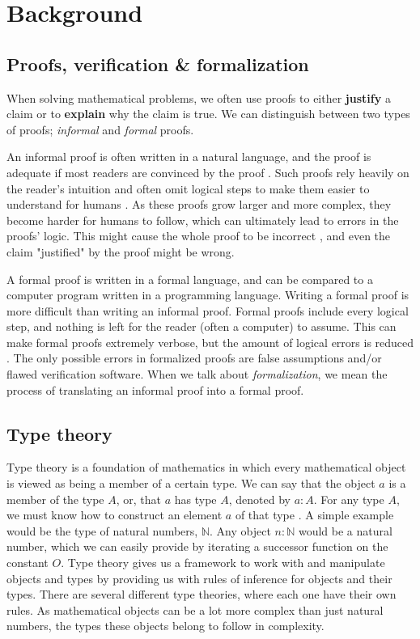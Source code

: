 \chapter{Background}
\label{ch:background}

\section{Proofs, verification \& formalization}
\label{sec:proofs_formalization}

When solving mathematical problems, we often use proofs
to either \textbf{justify} a claim or to \textbf{explain} why the claim is true.
We can distinguish between two types of proofs; \emph{informal} and \emph{formal} proofs.

An informal proof is often written in a natural language, and the proof is adequate if most
readers are convinced by the proof \cite[ch.~2]{bpierce}. Such proofs rely heavily on the reader's intuition
and often omit logical steps to make them easier to understand for humans \cite[p.~1371]{ams:formal-proof}.
As these proofs grow larger and more complex, they become harder for humans to follow,
which can ultimately lead to errors in the proofs' logic. This might cause the whole proof
to be incorrect \cite{rkhamsi}, and even the claim "justified" by the proof might be wrong.

A formal proof is written in a formal language, and can be compared to a computer program
written in a programming language. Writing a formal proof is more difficult than writing an informal proof.
Formal proofs include every logical step, and nothing is left for the reader (often a computer) to assume.
This can make formal proofs extremely verbose, but the amount of logical errors is reduced \cite[p.~1371]{ams:formal-proof}.
The only possible errors in formalized proofs are false assumptions and/or flawed verification software.
When we talk about \emph{formalization}, we mean the process of translating an informal proof into a formal proof.

\section{Type theory}
\label{sec:type_theory}

Type theory is a foundation of mathematics \cite{typetheorystan}
in which every mathematical object is viewed as being a member of a certain type.
We can say that the object $a$ is a member of the type $A$,
or, that $a$ has type $A$, denoted by $a : A$.
For any type $A$, we must know how to construct an element $a$ of that type \cite[p.~76]{lof1}.
A simple example would be the type of natural numbers, $\mathbb{N}$.
Any object $n : \mathbb{N}$ would be a natural number,
which we can easily provide by iterating a successor function on the constant $O$.
Type theory gives us a framework to work with and manipulate objects and types
by providing us with rules of inference for objects and their types.
There are several different type theories, where each one have their own rules.
As mathematical objects can be a lot more complex than just natural numbers,
the types these objects belong to follow in complexity.

